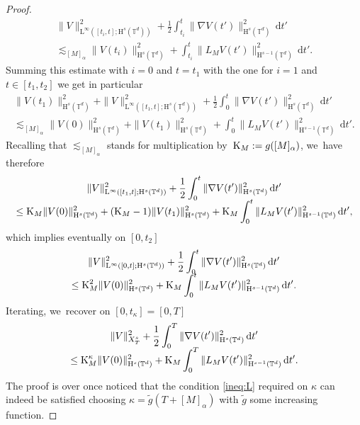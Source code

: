 \documentclass[JEP,XML,SOM,Unicode,published]{cedram}
\theoremstyle{definition}
\newcommand\T{\mathbb{T}}
\newcommand\dd{\mathrm{d}}
\renewcommand\H{\mathrm{H}}
\renewcommand\L{\mathrm{L}}
\begin{document}
\begin{proof}
\begin{multline*}
\|V\|_{\L^\infty([t_i,t];\H^s(\T^d))}^2 + \frac12 \int_{t_i}^{t} \|\nabla V(t')\|_{\H^s(\T^d)}^2\,\dd t'\\[
-5pt]
\lesssim_{[M]_\alpha} \|V(t_i)\|_{\H^s(\T^d)}^2 + \int_{t_i}^t\|L_{M }V(t')\|_{\H^{s-1}(\T^d)}^2\,\dd t'.
\end{multline*}
Summing this estimate with $i=0$ and $t=t_1$ with the one for $i=1$ and $t\in[t_1,t_2]$ we get in particular
\begin{multline*}
\|V(t_1)\|_{\H^s(\T^d)}^2 + \|V\|_{\L^\infty([t_1,t];\H^s(\T^d))}^2 + \frac12 \int_{0}^{t} \|\nabla V(t')\|_{\H^s(\T^d)}^2\,\dd t'\\\lesssim_{[M]_\alpha} \|V(0)\|_{\H^s(\T^d)}^2 + \|V(t_1)\|_{\H^s(\T^d)}^2 + \int_{0}^t\|L_{M }V(t')\|_{\H^{s-1}(\T^d)}^2\,\dd t'.
\end{multline*}
Recalling that $\lesssim_{[M]_\alpha}$ stands for multiplication by~$\textnormal{K}_M:=g([M]_\alpha)$, we~have therefore\vspace*{-5pt}
\begin{multline*}
\|V\|_{\L^\infty([t_1,t];\H^s(\T^d))}^2 + \frac12 \int_{0}^{t} \|\nabla V(t')\|_{\H^s(\T^d)}^2\,\dd t'\\[
-5pt]
\leq \textnormal{K}_{M}\|V(0)\|_{\H^s(\T^d)}^2 + (\textnormal{K}_{M}-1) \|V(t_1)\|_{\H^s(\T^d)}^2 + \textnormal{K}_{M} \int_{0}^t\|L_{M }V(t')\|_{\H^{s-1}(\T^d)}^2\,\dd t',
\end{multline*}
which implies eventually on $[0,t_2]$\vspace*{-5pt}
\begin{multline*}
\|V\|_{\L^\infty([0,t];\H^s(\T^d))}^2 + \frac12 \int_{0}^{t} \|\nabla V(t')\|_{\H^s(\T^d)}^2\,\dd t'\\[
-5pt]
\leq \textnormal{K}_{M}^2\|V(0)\|_{\H^s(\T^d)}^2 + \textnormal{K}_{M} \int_{0}^t\|L_{M }V(t')\|_{\H^{s-1}(\T^d)}^2\,\dd t'.
\end{multline*}
Iterating, we~recover on $[0,t_\kappa] = [0,T]$\vspace*{-5pt}
\begin{multline*}
\|V\|_{X_T^s}^2 + \frac12 \int_{0}^{T} \|\nabla V(t')\|_{\H^s(\T^d)}^2\,\dd t'\\[
-5pt]
\leq \textnormal{K}_{M}^\kappa\|V(0)\|_{\H^s(\T^d)}^2 + \textnormal{K}_{M} \int_{0}^T\|L_{M }V(t')\|_{\H^{s-1}(\T^d)}^2\,\dd t'.
\end{multline*}
The proof is over once noticed that the condition \eqref{ineq:L} required on $\kappa$ can indeed be satisfied choosing $\kappa=\widetilde g(T + [M]_\alpha)$ with $\widetilde g$ some increasing function.
\end{proof}
\end{document}
